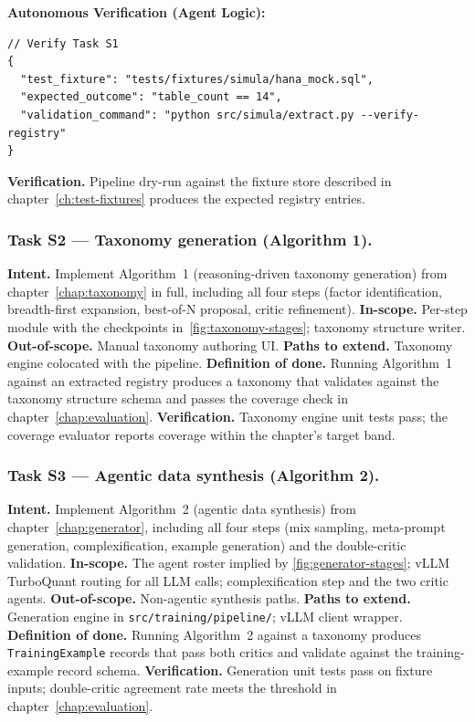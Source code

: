 \textbf{Autonomous Verification (Agent Logic):}
\begin{lstlisting}[language=jsonx]
// Verify Task S1
{
  "test_fixture": "tests/fixtures/simula/hana_mock.sql",
  "expected_outcome": "table_count == 14",
  "validation_command": "python src/simula/extract.py --verify-registry"
}
\end{lstlisting}

\textbf{Verification.} Pipeline dry-run against the fixture store
described in chapter~\ref{ch:test-fixtures} produces the expected
registry entries.

\subsubsection{Task S2 --- Taxonomy generation (Algorithm 1).}
\textbf{Intent.} Implement Algorithm~1 (reasoning-driven taxonomy
generation) from chapter~\ref{chap:taxonomy} in full, including all
four steps (factor identification, breadth-first expansion,
best-of-N proposal, critic refinement).
\textbf{In-scope.} Per-step module with the checkpoints
in~\ref{fig:taxonomy-stages}; taxonomy structure writer.
\textbf{Out-of-scope.} Manual taxonomy authoring UI.
\textbf{Paths to extend.} Taxonomy engine colocated with the
pipeline.
\textbf{Definition of done.} Running Algorithm~1 against an extracted
registry produces a taxonomy that validates against the taxonomy
structure schema and passes the coverage check in
chapter~\ref{chap:evaluation}.
\textbf{Verification.} Taxonomy engine unit tests pass; the
coverage evaluator reports coverage within the chapter's target
band.

\subsubsection{Task S3 --- Agentic data synthesis (Algorithm 2).}
\textbf{Intent.} Implement Algorithm~2 (agentic data synthesis) from
chapter~\ref{chap:generator}, including all four steps (mix
sampling, meta-prompt generation, complexification, example
generation) and the double-critic validation.
\textbf{In-scope.} The agent roster implied by
\ref{fig:generator-stages}; vLLM TurboQuant routing for all LLM
calls; complexification step and the two critic agents.
\textbf{Out-of-scope.} Non-agentic synthesis paths.
\textbf{Paths to extend.} Generation engine in
\texttt{src/training/pipeline/}; vLLM client wrapper.
\textbf{Definition of done.} Running Algorithm~2 against a taxonomy
produces \texttt{TrainingExample} records that pass both critics and
validate against the training-example record schema.
\textbf{Verification.} Generation unit tests pass on fixture inputs;
double-critic agreement rate meets the threshold in
chapter~\ref{chap:evaluation}.

